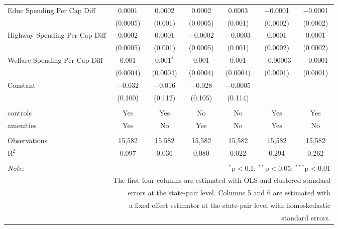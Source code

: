 \begin{table}[!htbp]
\begin{tabular}{@{\extracolsep{5pt}}lcccccc}
  Educ Spending Per Cap Diff & 0.0001 & 0.0002 & 0.0002 & 0.0003 & $-$0.0001 & $-$0.0001 \\ 
  & (0.0005) & (0.001) & (0.0005) & (0.001) & (0.0002) & (0.0002) \\ 
  Highway Spending Per Cap Diff & 0.0002 & 0.0001 & $-$0.0002 & $-$0.0003 & 0.0001 & 0.0001 \\ 
  & (0.0005) & (0.001) & (0.0005) & (0.001) & (0.0002) & (0.0002) \\ 
  Welfare Spending Per Cap Diff & 0.001 & 0.001$^{*}$ & 0.001 & 0.001 & $-$0.00003 & $-$0.0001 \\ 
  & (0.0004) & (0.0004) & (0.0004) & (0.0004) & (0.0001) & (0.0001) \\ 
  Constant & $-$0.032 & $-$0.016 & $-$0.028 & $-$0.0005 &  &  \\ 
  & (0.100) & (0.112) & (0.105) & (0.114) &  &  \\ 
 \hline \\[-1.8ex] 
controls & Yes & Yes & No & No & Yes & Yes \\ 
amenities & Yes & No & Yes & No & Yes & No \\ 
\hline \\[-1.8ex] 
Observations & 15,582 & 15,582 & 15,582 & 15,582 & 15,582 & 15,582 \\ 
R$^{2}$ & 0.097 & 0.036 & 0.080 & 0.022 & 0.294 & 0.262 \\ 
\hline 
\hline \\[-1.8ex] 
\textit{Note:}  & \multicolumn{6}{r}{$^{*}$p$<$0.1; $^{**}$p$<$0.05; $^{***}$p$<$0.01} \\ 
 & \multicolumn{6}{r}{The first four columns are estimated with OLS and clustered standard} \\ 
 & \multicolumn{6}{r}{ errors at the state-pair level. Columns 5 and 6 are estimated with} \\ 
 & \multicolumn{6}{r}{a fixed effect estimator at the state-pair level with homoskedastic} \\ 
 & \multicolumn{6}{r}{standard errors.} \\ 
\end{tabular} 
\end{table} 
